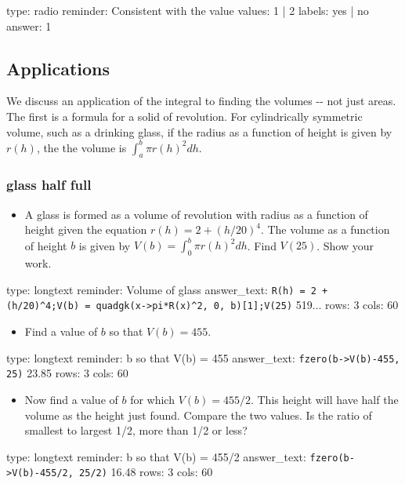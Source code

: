 \documentclass[12pt]{article}
\begin{document}
\begin{answer}
type: radio
reminder: Consistent with the value
values: 1 | 2
labels: yes | no
answer: 1
\end{answer}

\subsection{Applications}

We discuss an application of the integral to finding the volumes -{}-
not just areas. The first is a formula for a solid of revolution. For
cylindrically symmetric volume, such as a drinking glass, if the radius
as a function of height is given by $r(h)$, the the volume is
$\int_a^b \pi r(h)^2 dh$.

\subsubsection{glass half full}

\begin{itemize}
\itemsep1pt\parskip0pt
\item
  A glass is formed as a volume of revolution with radius as a function
  of height given the equation $r(h) = 2 + (h/20)^4$. The volume as a
  function of height $b$ is given by $V(b) = \int_0^b \pi   r(h)^2 dh$.
  Find $V(25)$. Show your work.
\end{itemize}

\begin{answer}
type: longtext
reminder: Volume of glass
answer_text: \verb#R(h) = 2 + (h/20)^4;V(b) = quadgk(x->pi*R(x)^2, 0, b)[1];V(25)# 519... 
rows: 3
cols: 60
\end{answer}

\begin{itemize}
\itemsep1pt\parskip0pt
\item
  Find a value of $b$ so that $V(b) = 455$.
\end{itemize}

\begin{answer}
type: longtext
reminder: b so that V(b) = 455
answer_text: \verb#fzero(b->V(b)-455, 25)# 23.85 
rows: 3
cols: 60
\end{answer}

\begin{itemize}
\itemsep1pt\parskip0pt
\item
  Now find a value of $b$ for which $V(b) = 455/2$. This height will
  have half the volume as the height just found. Compare the two values.
  Is the ratio of smallest to largest 1/2, more than 1/2 or less?
\end{itemize}

\begin{answer}
type: longtext
reminder: b so that V(b) = 455/2
answer_text: \verb#fzero(b->V(b)-455/2, 25/2)# 16.48 
rows: 3
cols: 60
\end{answer}
\end{document}
